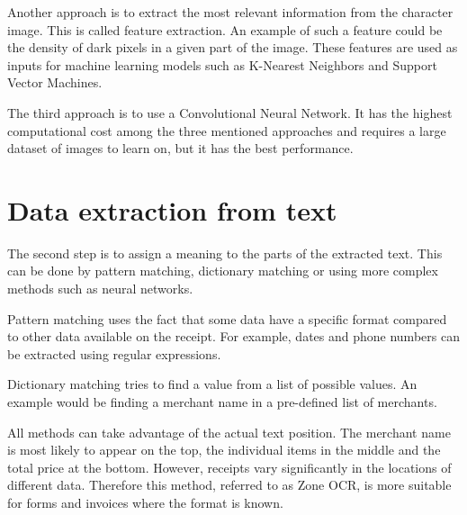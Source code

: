 \documentclass[
  digital, %
  table,   %
  oneside, %
  lof,     %
  lot,     %
]{fithesis3}
\begin{document}
Another approach is to extract the most relevant information from the character image. This is called feature extraction. An example of such a feature could be the density of dark pixels in a given part of the image. These features are used as inputs for machine learning models such as K-Nearest Neighbors and Support Vector Machines. \cite{Singh2011Feature}

The third approach is to use a Convolutional
Neural Network. It has the highest computational cost among the three mentioned approaches and requires a large dataset of images to learn on, but it has the best performance. \cite{Shreya2019OCRCNN}

\section{Data extraction from text}
The second step is to assign a meaning to the parts of the extracted text. This can be done by pattern matching, dictionary matching or using more complex methods such as neural networks. 

Pattern matching uses the fact that some data have a specific format compared to other data available on the receipt. For example, dates and phone numbers can be extracted using regular expressions.

Dictionary matching tries to find a value from a list of possible values. An example would be finding a merchant name in a pre-defined list of merchants.

All methods can take advantage of the actual text position. The merchant name is most likely to appear on the top, the individual items in the middle and the total price at the bottom. However, receipts vary significantly in the locations of different data. Therefore this method, referred to as Zone OCR, is more suitable for forms and invoices where the format is known.
\end{document}
